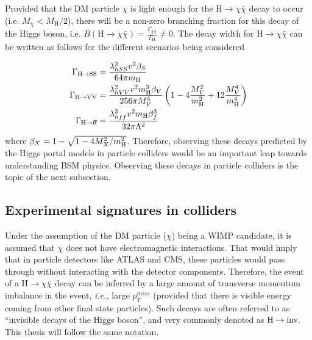 Provided that the DM particle $\chi$ is light enough for the $\textrm{H} \rightarrow \chi \bar{\chi}$ decay to occur (i.e. $M_{\chi} < M_{\textrm{H}} / 2$), there will be a non-zero
branching fraction for this decay of the Higgs boson, i.e. $B(\textrm{H} \rightarrow \chi \bar{\chi}) = \frac{\Gamma_{\chi\bar{\chi}}}{\Gamma_{\textrm{H}}} \neq 0$. The decay width for
$\textrm{H} \rightarrow \chi \bar{\chi}$ can be written as follows for the different scenarios being considered~\cite{Djouadi:2011aa}

\begin{equation}
    \begin{split}
        \Gamma_{\textrm{H} \rightarrow \textrm{SS}} &= \frac{\lambda_{hSS}^{2} v^{2} \beta_{S}}{64 \pi m_{\textrm{H}}} \\
        \Gamma_{\textrm{H} \rightarrow \textrm{VV}} &= \frac{\lambda_{hVV}^{2} v^{2} m_{\textrm{H}}^{3} \beta_{V}}{256 \pi M_{V}^{4}} \left( 1 - 4 \frac{M_V^2}{m_{\textrm{H}}^2} + 12 \frac{M_V^4}{m_{\textrm{H}}^4} \right) \\
        \Gamma_{\textrm{H} \rightarrow \textrm{ff}} &= \frac{\lambda_{hff}^{2} v^{2} m_{\textrm{H}} \beta_{f}^{3}}{32 \pi \Lambda^{2}}
    \end{split}
\end{equation}
where $\beta_{X} = 1 - \sqrt{1 - 4 M_X^2 / m_{\textrm{H}}^2}$. 
Therefore, observing these decays predicted by the Higgs portal models in particle colliders would be an important
leap towards understanding BSM physics. Observing these decays in particle colliders is the topic of the next subsection.

\subsection{Experimental signatures in colliders}
\label{subsec:exp_signatures}

Under the assumption of the DM particle ($\chi$) being a WIMP candidate, it is assumed that $\chi$ does not have electromagnetic interactions. That would imply
that in particle detectors like ATLAS and CMS, these particles would pass through without interacting with the detector components. Therefore, the event of a
$\textrm{H} \rightarrow \chi \bar{\chi}$ decay can be inferred by a large amount of transverse momentum imbalance in the event, \textit{i.e.,} large $p_T^{miss}$ (provided that there
is visible energy coming from other final state particles). Such decays are often referred to as ``invisible decays of the Higgs boson'', and very
commonly denoted as $\textrm{H} \rightarrow \textrm{inv.}$ This thesis will follow the same notation.

